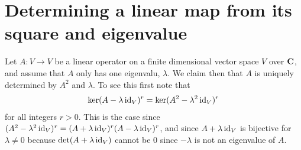 \section{Determining a linear map from its square and eigenvalue}

Let $A\colon V\to V$ be a linear operator on a finite dimensional vector space $V$ over $\mathbf{C}$, and assume that $A$ only has one eigenvalu, $\lambda$. We claim then that $A$ is uniquely determined by $A^2$ and $\lambda$. To see this first note that
\begin{align*}
  \ker(A-\lambda \operatorname{id}_V)^r = \ker(A^2-\lambda^2\operatorname{id}_V)^r
\end{align*}
for all integers $r>0$. This is the case since $(A^2-\lambda^2\operatorname{id}_V)^r = (A+\lambda\operatorname{id}_V)^r(A-\lambda\operatorname{id}_V)^r$, and since $A+\lambda\operatorname{id}_V$ is bijective for $\lambda\neq 0$ because $\det(A+\lambda\operatorname{id}_V)$ cannot be $0$ since $-\lambda$ is not an eigenvalue of $A$. 


